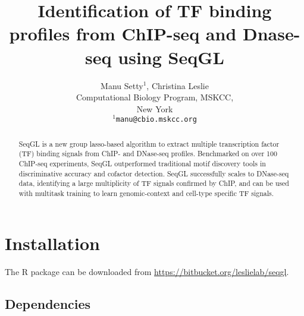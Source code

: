 \documentclass[10pt,oneside]{article}
\begin{document}






\title{\bf{Identification of TF binding profiles from ChIP-seq and Dnase-seq using SeqGL}}
\author{Manu Setty$^1$, Christina Leslie\\[1em]Computational Biology Program, MSKCC,\\ New York\\
\texttt{$^1$manu@cbio.mskcc.org}}



\maketitle

\begin{abstract}
SeqGL is a new group lasso-based algorithm to extract multiple transcription factor (TF) binding signals from ChIP- and DNase-seq profiles. Benchmarked on over 100 ChIP-seq experiments, SeqGL outperformed traditional motif discovery tools in discriminative accuracy and cofactor detection. SeqGL successfully scales to DNase-seq data, identifying a large multiplicity of TF signals confirmed by ChIP, and can be used with multitask training to learn genomic-context and cell-type specific TF signals.
\end{abstract}


\tableofcontents

\section{Installation}
The R package can be downloaded from \url{https://bitbucket.org/leslielab/seqgl}. 
\subsection {Dependencies}
\end{document}
